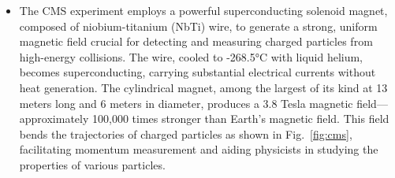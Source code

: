 \begin{itemize}

\item The CMS experiment employs a powerful superconducting solenoid magnet, composed of niobium-titanium (NbTi) wire, to generate a strong, uniform magnetic field crucial for detecting and measuring charged particles from high-energy collisions. The wire, cooled to -268.5°C with liquid helium, becomes superconducting, carrying substantial electrical currents without heat generation. The cylindrical magnet, among the largest of its kind at 13 meters long and 6 meters in diameter, produces a 3.8 Tesla magnetic field—approximately 100,000 times stronger than Earth's magnetic field. This field bends the trajectories of charged particles as shown in Fig.~\ref{fig:cms}, facilitating momentum measurement and aiding physicists in studying the properties of various particles.



\end{itemize}
